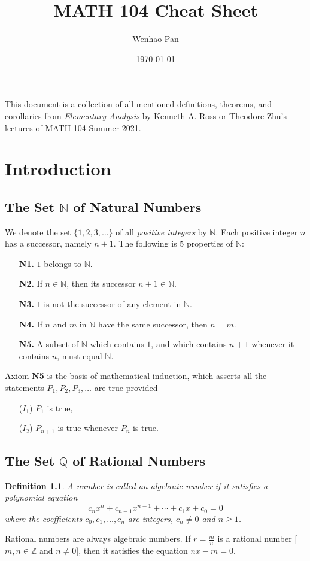 \documentclass[12pt, lettersize]{book}
\title{MATH 104 Cheat Sheet}
\author{Wenhao Pan}
\date{\today}
\newtheorem{dfn}[thm]{Definition}
\newcommand{\N}{\mathbb{N}}
\newcommand{\Q}{\mathbb{Q}}
\newcommand{\Z}{\mathbb{Z}}
\begin{document}
	\maketitle
	
	This document is a collection of all mentioned definitions, theorems, and corollaries from \emph{Elementary Analysis} by Kenneth A. Ross or Theodore Zhu's lectures of MATH 104 Summer 2021.
	
	\tableofcontents
	
	\chapter{Introduction}
	\newpage
	\section{The Set $\N$ of Natural Numbers}
	We denote the set $\{1,2,3,\dots\}$ of all \emph{positive integers} by $\N$. Each positive integer $n$ has a successor, namely $n+1$. The following is 5 properties of $\N$:
	\begin{itemize}
		\item[\textbf{N1.}] $1$ belongs to $\N$.
		\item[\textbf{N2.}] If $n\in\N$, then its successor $n+1\in\N$.
		\item[\textbf{N3.}] $1$ is not the successor of any element in $\N$.
		\item[\textbf{N4.}] If $n$ and $m$ in $\N$ have the same successor, then $n=m$.
		\item[\textbf{N5.}] A subset of $\N$ which contains $1$, and which contains $n+1$ whenever it contains $n$, must equal $\N$.
	\end{itemize}
	Axiom \textbf{N5} is the basis of mathematical induction, which asserts all the statements $P_1,P_2,P_3,\dots$ are true provided
	\begin{itemize}
		\item[(\textbf{$I_1$})] $P_1$ is true,
		\item[(\textbf{$I_2$})] $P_{n+1}$ is true whenever $P_n$ is true.
	\end{itemize}
	\newpage
	\section{The Set $\Q$ of Rational Numbers}
	\begin{dfn}
		A number is called an \emph{algebraic number} if it satisfies a polynomial equation
		\begin{displaymath}
			c_nx^n+c_{n-1}x^{n-1}+\cdots+c_1x+c_0=0
		\end{displaymath}
		where the coefficients $c_0,c_1,\dots,c_n$ are integers, $c_n\neq0$ and $n\geq1$.
	\end{dfn}
	Rational numbers are always algebraic numbers. If $r=\frac{m}{n}$ is a rational number [$m,n\in\Z$ and $n\neq0$], then it satisfies the equation $nx-m=0$.
	
\end{document}

